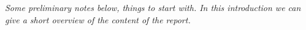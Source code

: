 \documentclass{misc/theme}
\newcommand{\block}[1]{\vspace{1.2cm}\begin{changemargin}{3cm}{3cm}\large\textit{#1}\end{changemargin}\vspace{0.6cm}}
\newcommand{\fakesection}[1]{%
  \par\refstepcounter{section}%
  \sectionmark{#1}%
  \addcontentsline{toc}{section}{\protect\numberline{\thesection}#1}%
}
\begin{document}
\maketitle
\tableofcontents

%
%

\block{Some preliminary notes below, things to start with. In this introduction we can give a short overview of the content of the report.}

%
% 



%
% 



%
% 



%
%

\newpage
\appendix

\end{document}
